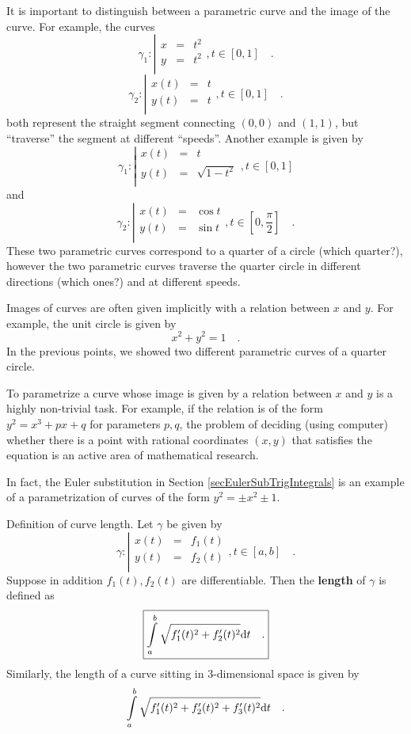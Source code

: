 \documentclass[12pt]{book}
\newcommand{\importantFormula}[1]{\begin{equation} \boxed{#1} \end{equation}}
\renewcommand{\emph}{\textbf}
\begin{document}
It is important to distinguish between a parametric curve and the image of the curve. For example, the curves
\[
\gamma_1:\left|
\begin{array}{rcl}
x&=&t^2\\
y&=&t^2\\
\end{array}\right., t\in [0,1]\quad .
\]
\[\gamma_2:\left|
\begin{array}{rcl}
x(t)&=&t\\
y(t)&=&t\\
\end{array}\right., t\in [0,1]\quad .
\]
both represent the straight segment connecting $(0,0)$ and $(1,1)$, but ``traverse'' the segment at different ``speeds''. Another example is given by
\[
\gamma_1:\left|
\begin{array}{rcl}
x(t)&=&t\\
y(t)&=&\sqrt{1-t^2}\\
\end{array}\right., t\in [0,1]
\]
and
\[
\gamma_2:\left|
\begin{array}{rcl}
x(t)&=&\cos t\\
y(t)&=&\sin t\\
\end{array}\right., t\in [0, \frac{\pi}{2}]\quad .
\]
These two parametric curves correspond to a quarter of a circle (which quarter?), however the two parametric curves traverse the quarter circle in different directions (which ones?) and at different speeds.

Images of curves are often given implicitly with a relation between $x$ and $y$. For example, the unit circle is given by
\[
x^2+y^2=1\quad .
\]
In the previous points, we showed two different parametric curves of a quarter circle.

To parametrize a curve whose image is given by a relation between $x$ and $y$ is a highly non-trivial task. For example, if the relation is of the form $y^2=x^3+px+q$ for parameters $p,q$, the problem of deciding (using computer) whether there is a point with rational coordinates $(x,y)$ that satisfies the equation is an active area of mathematical research. %

In fact, the Euler substitution in Section \ref{secEulerSubTrigIntegrals} is an example of a parametrization of curves of the form $y^2=\pm x^2\pm 1$.

Definition of curve length. Let $\gamma$ be given by
\[
\gamma:\left|
\begin{array}{rcl}
x(t)&=&f_1(t)\\
y(t)&=&f_2(t)\\
\end{array}\right., t\in [a,b]\quad .
\]
Suppose in addition $f_1(t), f_2(t)$ are differentiable. Then the \emph{length} of $\gamma$ is defined as
\importantFormula{
\label{eqDefLengthCurve}
\int\limits_{a}^b \sqrt{f_1'(t)^2+f_2'(t)^2}\diff t \quad .
}
Similarly, the length of a curve sitting in 3-dimensional space is given by
\[
\int\limits_{a}^b \sqrt{f_1'(t)^2+f_2'(t)^2+f_3'(t)^2}{\normalfont \text{d}} t \quad .
\]
\end{document}
